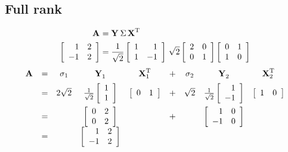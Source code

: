 \subsection{Full rank}
\begin{equation}
  \begin{split}
    \svda{T}\\
    \mat{rr}{1&2\\-1&2}&=\frac{1}{\sqrt{2}}\mat{rr}{1&1\\1&-1}\,\sqrt{2}\mat{cc}{2&0\\0&1}\mat{cc}{0&1\\1&0}    
  \end{split}
\end{equation}
%
\begin{equation}
  \begin{array}{ccccccccc}
    \A{} &=& \sigma_{1} & \Y{}_{1} & \X{T}_{1} &+& \sigma_{2} & \Y{}_{2} & \X{T}_{2} \\[5pt]
     &=& 2\sqrt{2} & \frac{1}{\sqrt{2}}\mat{r}{1\\1} & \mat{rr}{0&1} &+& \sqrt{2} & \frac{1}{\sqrt{2}}\mat{r}{1\\-1} & \mat{rr}{1&0}\\[10pt]
     &=&& \mat{cc}{0&2\\0&2} &&+&& \mat{rr}{1&0\\-1&0}\\[5pt]
     &=&& \mat{rr}{1&2\\-1&2}
  \end{array}
\end{equation}

